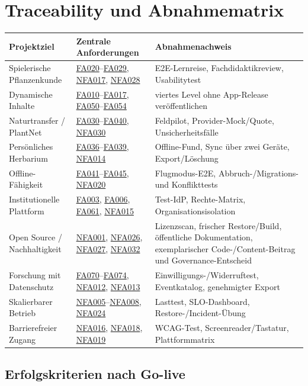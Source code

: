 \documentclass[10pt,a4paper,oneside]{article}
\newcommand{\R}[1]{\hyperlink{req:#1}{\textcolor{Forest}{#1}}}
\begin{document}
\section{Traceability und Abnahmematrix}\label{sec:traceability}

\begin{longtable}{@{}p{35mm}p{60mm}p{63mm}@{}}
\toprule
\textbf{Projektziel} & \textbf{Zentrale Anforderungen} & \textbf{Abnahmenachweis} \\
\midrule
\endhead
Spielerische Pflanzenkunde & \R{FA020}--\R{FA029}, \R{NFA017}, \R{NFA028} & E2E-Lernreise, Fachdidaktikreview, Usabilitytest \\
Dynamische Inhalte & \R{FA010}--\R{FA017}, \R{FA050}--\R{FA054} & viertes Level ohne App-Release veröffentlichen \\
Naturtransfer / PlantNet & \R{FA030}--\R{FA040}, \R{NFA030} & Feldpilot, Provider-Mock/Quote, Unsicherheitsfälle \\
Persönliches Herbarium & \R{FA036}--\R{FA039}, \R{NFA014} & Offline-Fund, Sync über zwei Geräte, Export/Löschung \\
Offline-Fähigkeit & \R{FA041}--\R{FA045}, \R{NFA020} & Flugmodus-E2E, Abbruch-/Migrations- und Konflikttests \\
Institutionelle Plattform & \R{FA003}, \R{FA006}, \R{FA061}, \R{NFA015} & Test-IdP, Rechte-Matrix, Organisationsisolation \\
Open Source / Nachhaltigkeit & \R{NFA001}, \R{NFA026}, \R{NFA027}, \R{NFA032} & Lizenzscan, frischer Restore/Build, öffentliche Dokumentation, exemplarischer Code-/Content-Beitrag und Governance-Entscheid \\
Forschung mit Datenschutz & \R{FA070}--\R{FA074}, \R{NFA012}, \R{NFA013} & Einwilligungs-/Widerruftest, Eventkatalog, genehmigter Export \\
Skalierbarer Betrieb & \R{NFA005}--\R{NFA008}, \R{NFA024} & Lasttest, SLO-Dashboard, Restore-/Incident-Übung \\
Barrierefreier Zugang & \R{NFA016}, \R{NFA018}, \R{NFA019} & WCAG-Test, Screenreader/Tastatur, Plattformmatrix \\
\bottomrule
\end{longtable}

\subsection{Erfolgskriterien nach Go-live}
\end{document}
